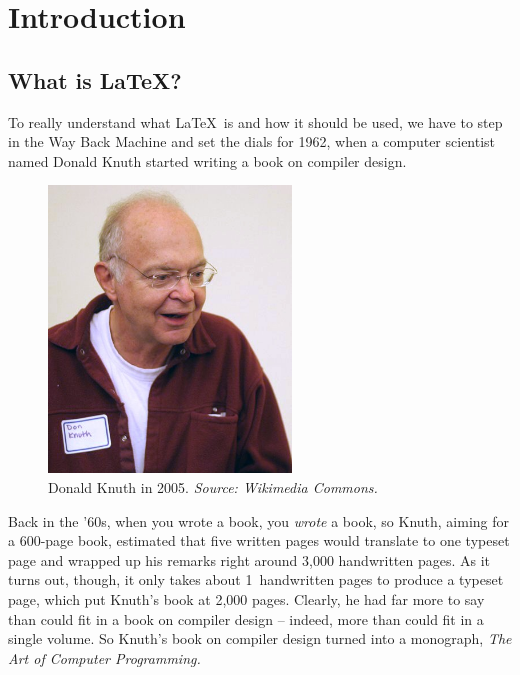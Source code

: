\documentclass[ignorenonframetext]{beamer}
\begin{document}
\begin{frame}
  \tableofcontents
\end{frame}


\section{Introduction} 
\subsection{What is \LaTeX?}
To really understand what \LaTeX\ is and how it should be used, we
have to step in the Way Back Machine and set the dials for 1962, when
a computer scientist named Donald Knuth started writing a book on
compiler design.

\begin{frame}
  \begin{figure}
    \centering
    \includegraphics[height=3in]{images/knuth.jpg}
    \caption{Donald Knuth in 2005.  \emph{Source: Wikimedia Commons.}}
    \label{fig:knuth}
  \end{figure}
\end{frame}

Back in the '60s, when you wrote a book, you \emph{wrote} a book, so
Knuth, aiming for a 600-page book, estimated that five written pages
would translate to one typeset page and wrapped up his remarks right
around 3,000 handwritten pages.  As it turns out, though, it only
takes about 1\textonehalf\ handwritten pages to produce a typeset
page, which put Knuth's book at 2,000 pages.  Clearly, he had far more
to say than could fit in a book on compiler design -- indeed, more
than could fit in a single volume.  So Knuth's book on compiler design
turned into a monograph, \emph{The Art of Computer Programming.}
\end{document}
